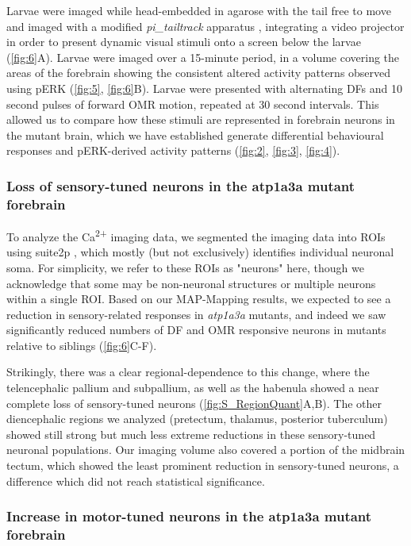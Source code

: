 Larvae were imaged while head-embedded in agarose with the tail free to move and imaged with a modified \emph{pi\_tailtrack} apparatus \citep{Randlett2023}, integrating a video projector in order to present dynamic visual stimuli onto a screen below the larvae (\autoref{fig:6}A). Larvae were imaged over a 15-minute period, in a volume covering the areas of the forebrain showing the consistent altered activity patterns observed using pERK (\autoref{fig:5}, \autoref{fig:6}B). 
Larvae were presented with alternating DFs and 10 second pulses of forward OMR motion, repeated at 30 second intervals. 
This allowed us to compare how these stimuli are represented in forebrain neurons in the mutant brain, which we have established generate differential behavioural responses and pERK-derived activity patterns (\autoref{fig:2}, \autoref{fig:3}, \autoref{fig:4}). 

\subsubsection{Loss of sensory-tuned neurons in the atp1a3a mutant forebrain}

To analyze the Ca\textsuperscript{2+} imaging data, we segmented the imaging data into ROIs using suite2p \citep{Pachitariu2016}, which mostly (but not exclusively) identifies individual neuronal soma.
For simplicity, we refer to these ROIs as "neurons" here, though we acknowledge that some may be non-neuronal structures or multiple neurons within a single ROI.
Based on our MAP-Mapping results, we expected to see a reduction in sensory-related responses in \emph{atp1a3a} mutants, and indeed we saw significantly reduced numbers of DF and OMR responsive neurons in mutants relative to siblings (\autoref{fig:6}C-F).


Strikingly, there was a clear regional-dependence to this change, where the telencephalic pallium and subpallium, as well as the habenula showed a near complete loss of sensory-tuned neurons (\autoref{fig:S_RegionQuant}A,B).  
The other diencephalic regions we analyzed (pretectum, thalamus, posterior tuberculum) showed still strong but much less extreme reductions in these sensory-tuned neuronal populations. 
Our imaging volume also covered a portion of the midbrain tectum, which showed the least prominent reduction in sensory-tuned neurons, a difference which did not reach statistical significance. 

\subsubsection{Increase in motor-tuned neurons in the atp1a3a mutant forebrain}

